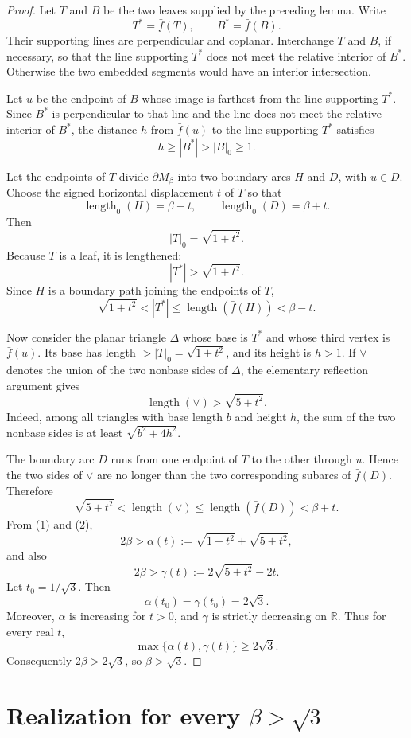 \documentclass[11pt]{article}
\newcommand{\R}{\mathbb R}
\newcommand{\len}{\operatorname{length}}
\begin{document}
\begin{proof}
Let \(T\) and \(B\) be the two leaves supplied by the preceding lemma.  Write
\[
T^*=\bar f(T),\qquad B^*=\bar f(B).
\]
Their supporting lines are perpendicular and coplanar.  Interchange \(T\) and \(B\), if necessary, so that the line supporting \(T^*\) does not meet the relative interior of \(B^*\).  Otherwise the two embedded segments would have an interior intersection.

Let \(u\) be the endpoint of \(B\) whose image is farthest from the line supporting \(T^*\).  Since \(B^*\) is perpendicular to that line and the line does not meet the relative interior of \(B^*\), the distance \(h\) from \(\bar f(u)\) to the line supporting \(T^*\) satisfies
\[
h\ge |B^*|>|B|_0\ge 1.
\]

Let the endpoints of \(T\) divide \(\partial M_\beta\) into two boundary arcs \(H\) and \(D\), with \(u\in D\).  Choose the signed horizontal displacement \(t\) of \(T\) so that
\[
\len_0(H)=\beta-t,\qquad \len_0(D)=\beta+t.
\]
Then
\[
|T|_0=\sqrt{1+t^2}.
\]
Because \(T\) is a leaf, it is lengthened:
\[
|T^*|>\sqrt{1+t^2}.
\]
Since \(H\) is a boundary path joining the endpoints of \(T\),
\[
\sqrt{1+t^2}<|T^*|\le \len(\bar f(H))<\beta-t. \tag{1}
\]

Now consider the planar triangle \(\Delta\) whose base is \(T^*\) and whose third vertex is \(\bar f(u)\).  Its base has length \(>|T|_0=\sqrt{1+t^2}\), and its height is \(h>1\).  If \(\vee\) denotes the union of the two nonbase sides of \(\Delta\), the elementary reflection argument gives
\[
\len(\vee)>\sqrt{5+t^2}.
\]
Indeed, among all triangles with base length \(b\) and height \(h\), the sum of the two nonbase sides is at least \(\sqrt{b^2+4h^2}\).

The boundary arc \(D\) runs from one endpoint of \(T\) to the other through \(u\).  Hence the two sides of \(\vee\) are no longer than the two corresponding subarcs of \(\bar f(D)\).  Therefore
\[
\sqrt{5+t^2}<\len(\vee)\le \len(\bar f(D))<\beta+t. \tag{2}
\]
From (1) and (2),
\[
2\beta>\alpha(t):=\sqrt{1+t^2}+\sqrt{5+t^2},
\]
and also
\[
2\beta>\gamma(t):=2\sqrt{5+t^2}-2t.
\]
Let \(t_0=1/\sqrt3\).  Then
\[
\alpha(t_0)=\gamma(t_0)=2\sqrt3.
\]
Moreover, \(\alpha\) is increasing for \(t>0\), and \(\gamma\) is strictly decreasing on \(\R\).  Thus for every real \(t\),
\[
\max\{\alpha(t),\gamma(t)\}\ge 2\sqrt3.
\]
Consequently \(2\beta>2\sqrt3\), so \(\beta>\sqrt3\).
\end{proof}

\section{Realization for every \(\beta>\sqrt3\)}
\end{document}
